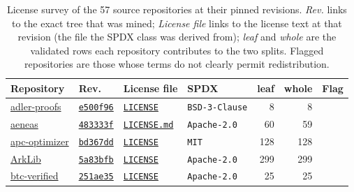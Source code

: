 \documentclass{article}
\begin{document}
\begin{table}[p]
  \caption{License survey of the 57 source repositories at their pinned revisions. \emph{Rev.}
  links to the exact tree that was mined; \emph{License file} links to the license text at that
  revision (the file the SPDX class was derived from); \emph{leaf} and \emph{whole} are the
  validated rows each repository contributes to the two splits. Flagged repositories are those
  whose terms do not clearly permit redistribution.}
  \label{tab:licenses}
  \centering
  \scriptsize
  \setlength{\tabcolsep}{3.5pt}
  \begin{tabular}{lllp{2.9cm}rrl}
    \toprule
    Repository & Rev. & License file & SPDX & leaf & whole & Flag \\
    \midrule
    \href{https://github.com/septract/adler-proofs}{adler-proofs} & \href{https://github.com/septract/adler-proofs/tree/e500f96af690e90eb185aa39caa798c07d671d82}{\texttt{e500f96}} & \href{https://github.com/septract/adler-proofs/blob/e500f96af690e90eb185aa39caa798c07d671d82/LICENSE}{\texttt{LICENSE}} & \texttt{BSD-3-Clause} & 8 & 8 &  \\
    \href{https://github.com/AeneasVerif/aeneas}{aeneas} & \href{https://github.com/AeneasVerif/aeneas/tree/483333f74278333101795c4e55dbf09e50763f37}{\texttt{483333f}} & \href{https://github.com/AeneasVerif/aeneas/blob/483333f74278333101795c4e55dbf09e50763f37/LICENSE.md}{\texttt{LICENSE.md}} & \texttt{Apache-2.0} & 60 & 59 &  \\
    \href{https://github.com/powdr-labs/apc-optimizer}{apc-optimizer} & \href{https://github.com/powdr-labs/apc-optimizer/tree/bd367dd92ecaabcdc3a308473fbe966da9a1c03c}{\texttt{bd367dd}} & \href{https://github.com/powdr-labs/apc-optimizer/blob/bd367dd92ecaabcdc3a308473fbe966da9a1c03c/LICENSE}{\texttt{LICENSE}} & \texttt{MIT} & 128 & 128 &  \\
    \href{https://github.com/Verified-zkEVM/ArkLib}{ArkLib} & \href{https://github.com/Verified-zkEVM/ArkLib/tree/5a83bfb4383503d70d7b5a05355d396855b3151b}{\texttt{5a83bfb}} & \href{https://github.com/Verified-zkEVM/ArkLib/blob/5a83bfb4383503d70d7b5a05355d396855b3151b/LICENSE}{\texttt{LICENSE}} & \texttt{Apache-2.0} & 299 & 299 &  \\
    \href{https://github.com/ProofOfKeags/btc-verified}{btc-verified} & \href{https://github.com/ProofOfKeags/btc-verified/tree/251ae35b2caf564608f0c6bc35933d7837bfe0c4}{\texttt{251ae35}} & \href{https://github.com/ProofOfKeags/btc-verified/blob/251ae35b2caf564608f0c6bc35933d7837bfe0c4/LICENSE}{\texttt{LICENSE}} & \texttt{Apache-2.0} & 25 & 25 &  \\

\end{tabular}
\end{table}
\end{document}
